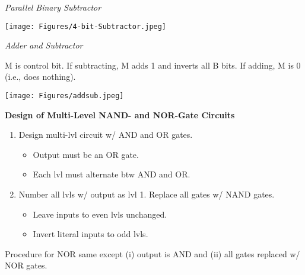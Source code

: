 \documentclass[twocolumn]{article}
\begin{document}
\textit{Parallel Binary Subtractor}

\texttt{[image: Figures/4-bit-Subtractor.jpeg]}


\textit{Adder and Subtractor}

M is control bit. If subtracting, M adds 1 and inverts all B bits. If adding, M is 0 (i.e., does nothing).

\texttt{[image: Figures/addsub.jpeg]}


\cleardoublepage


\textbf{Design of Multi-Level NAND- and NOR-Gate Circuits}

\vspace{-1em}
\begin{enumerate}
    \item Design multi-lvl circuit w/ AND and OR gates.
    \begin{itemize}
        \item Output must be an OR gate.
        \item Each lvl must alternate btw AND and OR.
    \end{itemize}
    \item Number all lvls w/ output as lvl 1. Replace all gates w/ NAND gates.
    \begin{itemize}
        \item Leave inputs to even lvls unchanged.
        \item Invert literal inputs to odd lvls.
    \end{itemize}
\end{enumerate} \vspace{-1em}

Procedure for NOR same except (i) output is AND and (ii) all gates replaced w/ NOR gates.
\end{document}
